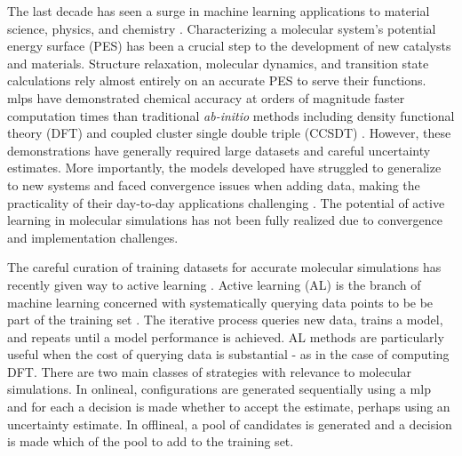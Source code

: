 \documentclass[%
 reprint,
 amsmath,amssymb,
 aps,
]{revtex4-2}
\begin{document}
The last decade has seen a surge in machine learning applications to material science, physics, and chemistry \cite{Artrith2014, Rupp2015, Natarajan2016, Peterson2016, Behler2016, Khorshidi2016, Bartok2010}. Characterizing a molecular system's potential energy surface (PES) has been a crucial step to the development of new catalysts and materials. Structure relaxation, molecular dynamics, and transition state calculations rely almost entirely on an accurate PES to serve their functions. \gls{mlp}s have demonstrated chemical accuracy at orders of magnitude faster computation times than traditional \textit{ab-initio} methods including density functional theory (DFT) and coupled cluster single double triple (CCSDT)  \cite{Zuo2020}. However, these demonstrations have generally required large datasets and careful uncertainty estimates. More importantly, the models developed have struggled to generalize to new systems and faced convergence issues when adding data, making the practicality of their day-to-day applications challenging \cite{Chen2020, Mueller2020, Behler2016, Schleder2019}. The potential of active learning in molecular simulations has not been fully realized due to convergence and implementation challenges. 

 The careful curation of training datasets for accurate molecular simulations has recently given way to active learning \cite{Vandermause2020, Jinnouchi2019, GarridoTorres2019, DelRio2019}. Active learning (AL) is the branch of machine learning concerned with systematically querying data points to be be part of the training set \cite{Settles2010}. The iterative process queries new data, trains a model, and repeats until a model performance is achieved. AL methods are particularly useful when the cost of querying data is substantial - as in the case of computing DFT. There are two main classes of strategies with relevance to molecular simulations. In \gls{onlineal}, configurations are generated sequentially using a \gls{mlp} and for each a decision is made whether to accept the estimate, perhaps using an uncertainty estimate. In \gls{offlineal}, a pool of candidates is generated and a decision is made which of the pool to add to the training set. 
\end{document}
